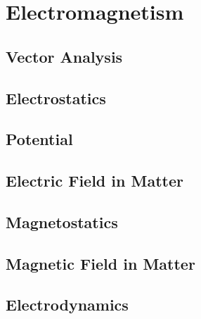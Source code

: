 \documentclass[10pt]{report}
\begin{document}
\pagestyle{empty}
\nocite{King2009}
\nocite{Boas2005}
\nocite{Griffiths2017}
\nocite{Serway2014}
\nocite{Serway2019}


\chapter{Electromagnetism}\clearpage
\section{Vector Analysis}
\clearpage

\section{Electrostatics}
\clearpage
\clearpage

\section{Potential}
\clearpage
\clearpage

\section{Electric Field in Matter}
\clearpage

\section{Magnetostatics}
\clearpage
\clearpage

\section{Magnetic Field in Matter}
\clearpage

\section{Electrodynamics}
\clearpage
\clearpage
\end{document}
